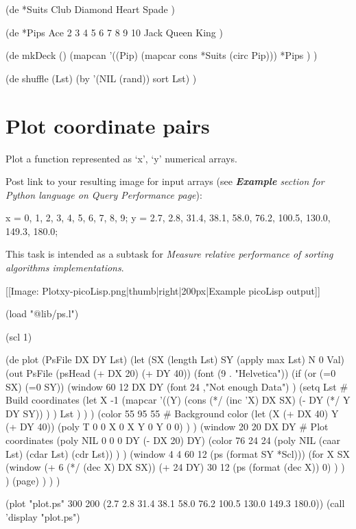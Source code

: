 \begin{wideverbatim}

(de *Suits
   Club Diamond Heart Spade )

(de *Pips
   Ace 2 3 4 5 6 7 8 9 10 Jack Queen King )

(de mkDeck ()
   (mapcan
      '((Pip) (mapcar cons *Suits (circ Pip)))
      *Pips ) )

(de shuffle (Lst)
   (by '(NIL (rand)) sort Lst) )

\end{wideverbatim}

\pagebreak{}
\section*{Plot coordinate pairs}

Plot a function represented as `x', `y' numerical arrays.

Post link to your resulting image for input arrays (see
\emph{\textbf{Example} section for Python
language on \emph{Query Performance} page}):

\begin{wideverbatim}
x = {0, 1, 2, 3, 4, 5, 6, 7, 8, 9};
y = {2.7, 2.8, 31.4, 38.1, 58.0, 76.2, 100.5, 130.0, 149.3, 180.0};
\end{wideverbatim}

This task is intended as a subtask for \emph{Measure relative
  performance of sorting algorithms implementations}.


\begin{wideverbatim}

[[Image: Plotxy-picoLisp.png|thumb|right|200px|Example picoLisp output]]

(load "@lib/ps.l")

(scl 1)

(de plot (PsFile DX DY Lst)
   (let (SX (length Lst)  SY (apply max Lst)  N 0 Val)
      (out PsFile
         (psHead (+ DX 20) (+ DY 40))
         (font (9 . "Helvetica"))
         (if (or (=0 SX) (=0 SY))
            (window 60 12 DX DY
               (font 24 ,"Not enough Data") )
            (setq Lst  # Build coordinates
               (let X -1
                  (mapcar
                     '((Y)
                        (cons
                           (*/ (inc 'X) DX SX)
                           (- DY (*/ Y DY SY)) ) )
                     Lst ) ) )
            (color 55 95 55  # Background color
               (let (X (+ DX 40) Y (+ DY 40))
                  (poly T  0 0  X 0  X Y  0 Y  0 0) ) )
            (window 20 20 DX DY  # Plot coordinates
               (poly NIL 0 0  0 DY  (- DX 20) DY)
               (color 76 24 24
                  (poly NIL (caar Lst) (cdar Lst) (cdr Lst)) ) )
            (window 4 4 60 12 (ps (format SY *Scl)))
            (for X SX
               (window (+ 6 (*/ (dec X) DX SX)) (+ 24 DY) 30 12
                  (ps (format (dec X)) 0) ) ) )
         (page) ) ) )

(plot "plot.ps" 300 200 (2.7 2.8 31.4 38.1 58.0 76.2 100.5 130.0 149.3 180.0))
(call 'display "plot.ps")

\end{wideverbatim}

